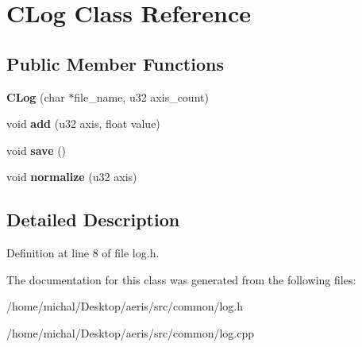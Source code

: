\hypertarget{classCLog}{\section{C\-Log Class Reference}
\label{classCLog}
}
\subsection*{Public Member Functions}
\begin{DoxyCompactItemize}
\item 
\hypertarget{classCLog_a9df35317fb04d9dfb8b6c5b9a02ebca1}{{\bfseries C\-Log} (char $\ast$file\-\_\-name, u32 axis\-\_\-count)}\label{classCLog_a9df35317fb04d9dfb8b6c5b9a02ebca1}

\item 
\hypertarget{classCLog_a5058dda9dc407a893ace241c8b501e03}{void {\bfseries add} (u32 axis, float value)}\label{classCLog_a5058dda9dc407a893ace241c8b501e03}

\item 
\hypertarget{classCLog_ac4ccfd657b31889801da52f5ab6ea956}{void {\bfseries save} ()}\label{classCLog_ac4ccfd657b31889801da52f5ab6ea956}

\item 
\hypertarget{classCLog_aff99bb8696509a978590c349c3c7eb4b}{void {\bfseries normalize} (u32 axis)}\label{classCLog_aff99bb8696509a978590c349c3c7eb4b}

\end{DoxyCompactItemize}


\subsection{Detailed Description}


Definition at line 8 of file log.\-h.



The documentation for this class was generated from the following files\-:\begin{DoxyCompactItemize}
\item 
/home/michal/\-Desktop/aeris/src/common/log.\-h\item 
/home/michal/\-Desktop/aeris/src/common/log.\-cpp\end{DoxyCompactItemize}
